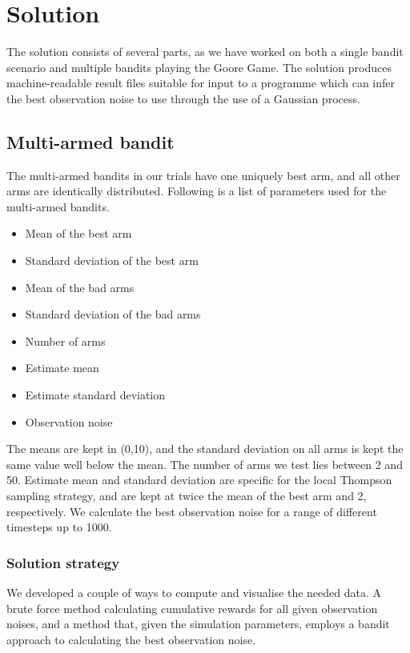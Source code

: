 \chapter{Solution}
\label{ch:solution}

The solution consists of several parts, as we have worked on both a single bandit scenario and multiple bandits playing the Goore Game.
The solution produces machine-readable result files suitable for input to a programme which can infer the best observation noise to use through the use of a Gaussian process.

\section{Multi-armed bandit}

The multi-armed bandits in our trials have one uniquely best arm, and all other arms are identically distributed.
Following is a list of parameters used for the multi-armed bandits.
\begin{itemize}
    \item Mean of the best arm
    \item Standard deviation of the best arm
    \item Mean of the bad arms
    \item Standard deviation of the bad arms
    \item Number of arms
    \item Estimate mean
    \item Estimate standard deviation
    \item Observation noise
\end{itemize}

The means are kept in (0,10), and the standard deviation on all arms is kept the same value well below the mean.
The number of arms we test lies between 2 and 50.
Estimate mean and standard deviation are specific for the local Thompson sampling strategy, and are kept at twice the mean of the best arm and 2, respectively.
We calculate the best observation noise for a range of different timesteps up to 1000.

\subsection{Solution strategy}

We developed a couple of ways to compute and visualise the needed data.
A brute force method calculating cumulative rewards for all given observation noises, and a method that, given the simulation parameters, employs a bandit approach to calculating the best observation noise.

